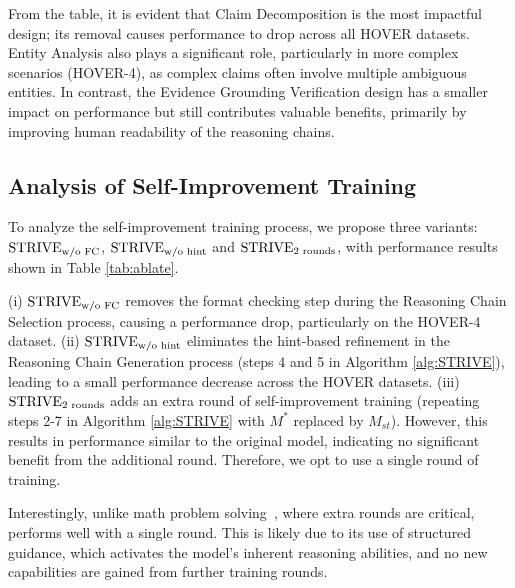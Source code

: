 From the table, it is evident that Claim Decomposition is the most impactful design; its removal causes performance to drop across all HOVER datasets. Entity Analysis also plays a significant role, particularly in more complex scenarios (HOVER-4), as complex claims often involve multiple ambiguous entities. In contrast, the Evidence Grounding Verification design has a smaller impact on performance but still contributes valuable benefits, primarily by improving human readability of the reasoning chains.

\subsection{Analysis of Self-Improvement Training}
To analyze the self-improvement training process, we propose three variants: $\text{STRIVE}_{\text{w/o FC}}$, $\text{STRIVE}_{\text{w/o hint}}$ and $\text{STRIVE}_{2\text{ rounds}}$, with performance results shown in Table \ref{tab:ablate}.

(i) $\text{STRIVE}_{\text{w/o FC}}$ removes the format checking step during the Reasoning Chain Selection process, causing a performance drop, particularly on the HOVER-4 dataset. (ii) $\text{STRIVE}_{\text{w/o hint}}$ eliminates the hint-based refinement in the Reasoning Chain Generation process (steps 4 and 5 in Algorithm \ref{alg:STRIVE}), leading to a small performance decrease across the HOVER datasets. (iii) $\text{STRIVE}_{2\text{ rounds}}$ adds an extra round of self-improvement training (repeating steps 2-7 in Algorithm \ref{alg:STRIVE} with $M^*$ replaced by $M_{st}$). However, this results in performance similar to the original model, indicating no significant benefit from the additional round. Therefore, we opt to use a single round of training.

Interestingly, unlike math problem solving~\cite{zelikman2022star,hosseini2024v}, where extra rounds are critical, \themodel performs well with a single round. This is likely due to its use of structured guidance, which activates the model's inherent reasoning abilities, and no new capabilities are gained from further training rounds.
